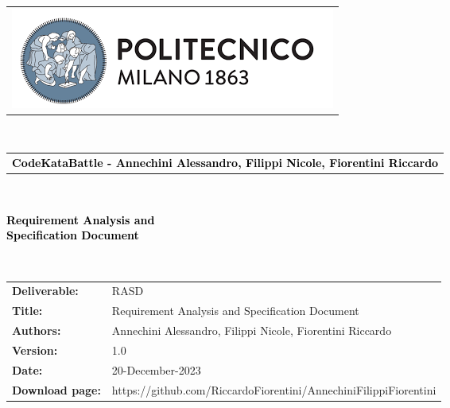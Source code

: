 


\begin{titlepage}

{\begin{table}[t!]
\centering
\begin{tabu} to \textwidth { X[3,c,m]}
    \includegraphics[scale=0.5]{Images/PolimiLogo} 
\end{tabu}
~\\ [2cm]
\begin{tabu} to \textwidth {X[2,l,m] }
    \textcolor{Black}{\textbf{\small{CodeKataBattle - Annechini Alessandro, Filippi Nicole, Fiorentini Riccardo}}}
\end{tabu}
\end{table}}~\\ [5cm]


\begin{flushleft}
\centering
{\textcolor{Black}{\textbf{\Huge{Requirement Analysis and\\ Specification
        Document}}}} \\ [1cm]
\end{flushleft}

~\\[2cm]

\begin{table}[h!]
\begin{tabu} to \textwidth { X[0.22,r,p] X[0.75,l,p] }
\hline
\textbf{Deliverable:} & RASD\\
\textbf{Title:} & Requirement Analysis and Specification Document \\
\textbf{Authors:} & Annechini Alessandro, Filippi Nicole, Fiorentini Riccardo\\
\textbf{Version:} & 1.0 \\ 
\textbf{Date:} & 20-December-2023 \\
\textbf{Download page:} & https://github.com/RiccardoFiorentini/AnnechiniFilippiFiorentini\\
\hline
\end{tabu}
\end{table}

\end{titlepage}




